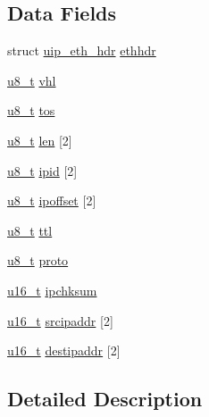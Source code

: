 \subsection*{Data Fields}
\begin{DoxyCompactItemize}
\item 
struct \hyperlink{structuip__eth__hdr}{uip\_\-eth\_\-hdr} \hyperlink{structethip__hdr_aaceedb68bd3ad7e63e5829fe0559c79d}{ethhdr}
\item 
\hyperlink{group__uipfw_ga4caecabca98b43919dd11be1c0d4cd8e}{u8\_\-t} \hyperlink{structethip__hdr_a790ec39bb30ced25b79b0178fd79e4e4}{vhl}
\item 
\hyperlink{group__uipfw_ga4caecabca98b43919dd11be1c0d4cd8e}{u8\_\-t} \hyperlink{structethip__hdr_a26d6e202f33ab326f931b61347c9097a}{tos}
\item 
\hyperlink{group__uipfw_ga4caecabca98b43919dd11be1c0d4cd8e}{u8\_\-t} \hyperlink{structethip__hdr_adf04415fa4f1d2c7c038aa131cdc640e}{len} \mbox{[}2\mbox{]}
\item 
\hyperlink{group__uipfw_ga4caecabca98b43919dd11be1c0d4cd8e}{u8\_\-t} \hyperlink{structethip__hdr_a694c2d47b9b06967c51d730fc880701d}{ipid} \mbox{[}2\mbox{]}
\item 
\hyperlink{group__uipfw_ga4caecabca98b43919dd11be1c0d4cd8e}{u8\_\-t} \hyperlink{structethip__hdr_a533fe5b5de891fd06dd8a270869b9d1e}{ipoffset} \mbox{[}2\mbox{]}
\item 
\hyperlink{group__uipfw_ga4caecabca98b43919dd11be1c0d4cd8e}{u8\_\-t} \hyperlink{structethip__hdr_a1d197be2f56f3f065dd4ecdee58a5b02}{ttl}
\item 
\hyperlink{group__uipfw_ga4caecabca98b43919dd11be1c0d4cd8e}{u8\_\-t} \hyperlink{structethip__hdr_aeac57681623f14a72fcadfc62a2bb37f}{proto}
\item 
\hyperlink{group__uipfw_ga77570ac4fcab86864fa1916e55676da2}{u16\_\-t} \hyperlink{structethip__hdr_a9f042cc7112fc0e2c05216b14c53a2b1}{ipchksum}
\item 
\hyperlink{group__uipfw_ga77570ac4fcab86864fa1916e55676da2}{u16\_\-t} \hyperlink{structethip__hdr_a74e65215e26a9597a57a7be6a633f63a}{srcipaddr} \mbox{[}2\mbox{]}
\item 
\hyperlink{group__uipfw_ga77570ac4fcab86864fa1916e55676da2}{u16\_\-t} \hyperlink{structethip__hdr_ac25d5ca919211b67436eed0065938015}{destipaddr} \mbox{[}2\mbox{]}
\end{DoxyCompactItemize}


\subsection{Detailed Description}


